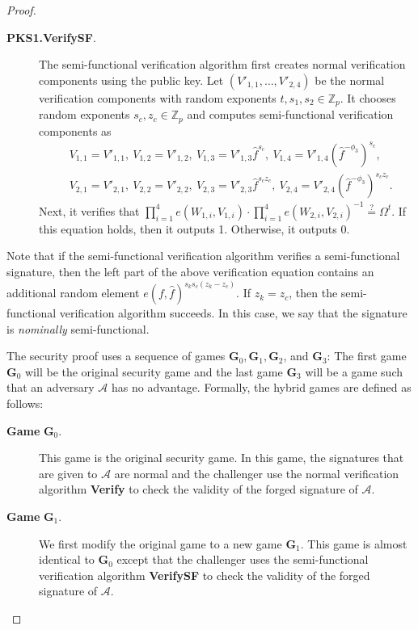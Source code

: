 \documentclass[11pt,letterpaper]{article}
\newcommand{\Z}{\mathbb{Z}}
\newcommand{\mc}[1]{\mathcal{#1}}
\newcommand{\tb}[1]{\textbf{#1}}
\begin{document}
\begin{proof}
\begin{description}
\item [\textbf{PKS1.VerifySF}.] The semi-functional verification algorithm
    first creates normal verification components using the public key. Let
    $(V'_{1,1}, \ldots, V'_{2,4})$ be the normal verification components
    with random exponents $t, s_1, s_2 \in \Z_p$. It chooses random
    exponents $s_c, z_c \in \Z_p$ and computes semi-functional verification
    components as
    \begin{align*}
    &   V_{1,1} = V'_{1,1},~
        V_{1,2} = V'_{1,2},~
        V_{1,3} = V'_{1,3} \hat{f}^{s_c},~
        V_{1,4} = V'_{1,4} (\hat{f}^{-\phi_3})^{s_c}, \\
    &   V_{2,1} = V'_{2,1},~
        V_{2,2} = V'_{2,2},~
        V_{2,3} = V'_{2,3} \hat{f}^{s_c z_c},~
        V_{2,4} = V'_{2,4} (\hat{f}^{-\phi_3})^{s_c z_c}.
    \end{align*}
    Next, it verifies that $\prod_{i=1}^4 e(W_{1,i}, V_{1,i}) \cdot
    \prod_{i=1}^4 e(W_{2,i}, V_{2,i})^{-1} \stackrel{?}{=} \Omega^t$. If
    this equation holds, then it outputs 1. Otherwise, it outputs 0.
\end{description}

\noindent Note that if the semi-functional verification algorithm verifies a
semi-functional signature, then the left part of the above verification
equation contains an additional random element $e(f, \hat{f})^{s_k s_c (z_k -
z_c)}$. If $z_k = z_c$, then the semi-functional verification algorithm
succeeds. In this case, we say that the signature is \textit{nominally}
semi-functional.

The security proof uses a sequence of games $\tb{G}_0, \tb{G}_1, \tb{G}_2$,
and $\tb{G}_3$: The first game $\tb{G}_0$ will be the original security game
and the last game $\tb{G}_3$ will be a game such that an adversary $\mc{A}$
has no advantage. Formally, the hybrid games are defined as follows:

\begin{description}
\item [\textbf{Game} $\tb{G}_0$.] This game is the original security game.
    In this game, the signatures that are given to $\mc{A}$ are normal and
    the challenger use the normal verification algorithm \textbf{Verify} to
    check the validity of the forged signature of $\mc{A}$.

\item [\textbf{Game} $\tb{G}_1$.] We first modify the original game to a
    new game $\tb{G}_1$. This game is almost identical to $\tb{G}_0$ except
    that the challenger uses the semi-functional verification algorithm
    \textbf{VerifySF} to check the validity of the forged signature of
    $\mc{A}$.


\end{description}
\end{proof}
\end{document}
